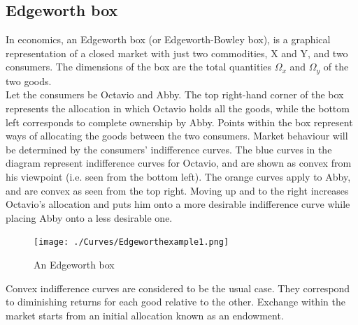 \documentclass[a4paper, 12pt, reqno]{article}
\begin{document}
\subsection{Edgeworth box}
In economics, an Edgeworth box (or Edgeworth-Bowley box), is a graphical representation of a closed market with just two commodities, X and Y, and two consumers. 
The dimensions of the box are the total quantities $\Omega_x$ and $\Omega_y$ of the two goods. \\
Let the consumers be Octavio and Abby. The top right-hand corner of the box represents the allocation in which Octavio holds all the goods, while the bottom left corresponds to complete ownership by Abby. 
Points within the box represent ways of allocating the goods between the two consumers.
Market behaviour will be determined by the consumers' indifference curves. The blue curves in the diagram represent indifference curves for Octavio, and are shown as convex from his viewpoint (i.e. seen from the bottom left). 
The orange curves apply to Abby, and are convex as seen from the top right. Moving up and to the right increases Octavio's allocation and puts 
him onto a more desirable indifference curve while placing Abby onto a less desirable one. 
\begin{figure}[H]
    \centering
    \texttt{[image: ./Curves/Edgeworthexample1.png]}
    \caption{An Edgeworth box}
    \label{fig: An Edgeworth box} 
\end{figure}  
Convex indifference curves are considered to be the usual case. 
They correspond to diminishing returns for each good relative to the other.
Exchange within the market starts from an initial allocation known as an endowment. \\
\end{document}
